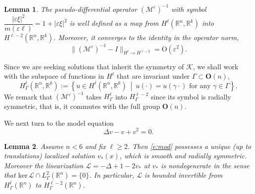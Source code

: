 \documentclass[10pt]{article}
\newtheorem{Lemma}{Lemma}[section]
\newcommand{\R}{\mathbb{R}}
\newcommand{\Ns}{\mathrm{ker\,}}
\newcommand{\rmO}{\mathrm{O}}
\newcommand{\eps}{\varepsilon}
\newcommand{\K}{\mathcal{K}}
\newcommand{\cL}{\mathcal{L}}
\newcommand{\M}{\mathcal{M}}
\renewcommand{\geq}{\geqslant}
\begin{document}
\iffalse
recall we defined \[ 
\widehat{\mathcal{M}^\eps v}(\xi) = \frac{m(\eps\xi)}{|\eps\xi|^2}\widehat{v}(\xi)=\frac{1}{1+|\eps\xi|^2} \widehat{v}(\xi). 
\] 
Since $1/(1+|\eps \xi|^2)$ is a bounded function on $\R^n$, $\M^\eps$ maps $H^\ell(\R^n,\R^k)$ into itself. And we had
\fi


\begin{Lemma}\label{estmult}The pseudo-differential operator $(\M^\eps)^{-1}$ with symbol $\dfrac{|\eps\xi|^2}{m(\eps\ell)}=1+|\eps\xi|^2 $ is well defined as a map from $H^\ell  (\R^n,\R^k)$ into $H^{\ell-2} (\R^n,\R^k)$. Moreover, it converges to the identity in the operator norm, 
\begin{equation}\label{e:precond}
\|(\M^\eps)^{-1}-I\|_{H^\ell \to H^{\ell-2}} = \rmO(\eps^2).
\end{equation}
\end{Lemma}
Since we are seeking solutions that inherit the symmetry of $\K$, we shall work with the subspace of functions in $H^\ell$ that are invariant under  $\Gamma \subset \mathbf{O}(n)$,
\[
H^\ell_{\Gamma}(\R^n,\R^k):=\left\{  u \in H^{\ell}(\R^n,\R^k) \ \middle|\    u(\cdot) = u (\gamma\cdot) \text{ for any } \gamma \in \Gamma\right\}.
\]
We remark that $(\M^\eps)^{-1}$ takes  $H^\ell_{\Gamma}$ into $H^{\ell-2}_{\Gamma}$ since its symbol is radially symmetric, that is, it commutes with the full group $\mathbf{O}(n)$.

We next turn to the model equation
\begin{equation}\label{e:mod}
\Delta v - v +v^2 = 0.
\end{equation}

\begin{Lemma}\label{nondeg}
Assume $n<6$ and fix $\ell\geq 2$. %
Then \eqref{e:mod} possesses a unique (up to translations) localized solution $v_*(x)$, which is smooth and radially symmetric. Moreover  the linearization $\cL = -\Delta+1-2v_*$ at $v_*$ is nondegenerate in the  sense that  $\Ns \cL \cap L^2_{\Gamma}(\R^n) = \{0\}$. In particular, $\cL$ is bounded invertible from  $H^{\ell}_{\Gamma}(\R^n)$ to $H^{\ell-2}_{\Gamma}(\R^n)$.
\end{Lemma}
\end{document}
